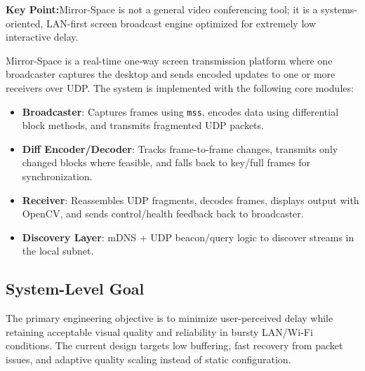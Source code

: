 \documentclass[12pt,a4paper]{article}
\begin{document}
\begin{tcolorbox}[colback=lightblue, colframe=iiitkblue, arc=5pt, boxrule=1pt]
\textbf{Key Point:}\enspace Mirror-Space is not a general video conferencing tool; it is a systems-oriented, LAN-first screen broadcast engine optimized for extremely low interactive delay.
\end{tcolorbox}

Mirror-Space is a real-time one-way screen transmission platform where one broadcaster captures the desktop and sends encoded updates to one or more receivers over UDP. The system is implemented with the following core modules:
\begin{itemize}[leftmargin=*, itemsep=4pt]
  \item \textbf{Broadcaster}: Captures frames using \texttt{mss}, encodes data using differential block methods, and transmits fragmented UDP packets.
  \item \textbf{Diff Encoder/Decoder}: Tracks frame-to-frame changes, transmits only changed blocks where feasible, and falls back to key/full frames for synchronization.
  \item \textbf{Receiver}: Reassembles UDP fragments, decodes frames, displays output with OpenCV, and sends control/health feedback back to broadcaster.
  \item \textbf{Discovery Layer}: mDNS + UDP beacon/query logic to discover streams in the local subnet.
\end{itemize}

\subsection{System-Level Goal}
The primary engineering objective is to minimize user-perceived delay while retaining acceptable visual quality and reliability in bursty LAN/Wi-Fi conditions. The current design targets low buffering, fast recovery from packet issues, and adaptive quality scaling instead of static configuration.
\end{document}
